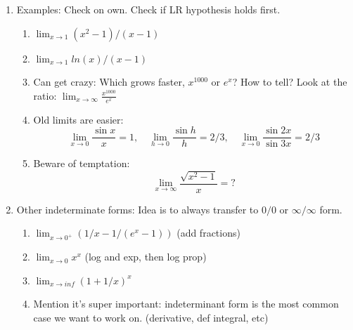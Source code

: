 \documentclass{article}
\newcommand{\ds}{\displaystyle}
\begin{document}
\begin{enumerate}
\item Examples: Check on own. Check if LR hypothesis holds first.
\begin{enumerate}
\item $\ds \lim_{x \rightarrow 1} (x^2-1)/(x-1)$
\item $\ds \lim_{x \rightarrow 1} ln(x)/(x-1)$
\item Can get crazy: Which grows faster, $x^{1000}$ or $e^x$? How to tell? Look at the ratio: $\ds \lim_{x\rightarrow \infty} \frac{x^{1000}}{e^x}$
\item Old limits are easier:
$$
\lim_{x\rightarrow 0 } \frac{\sin x}{x} = 1,\quad 
\lim_{h\rightarrow 0} \frac{\sin h}{h} = 2/3,\quad 
\lim_{x\rightarrow 0} \frac{\sin 2x}{\sin 3x} = 2/3
$$
\item Beware of temptation: 
$$\lim_{x\rightarrow \infty} \frac{\sqrt{x^2-1}}{x} = ?$$
\end{enumerate}

\item Other indeterminate forms: Idea is to always transfer to $0/0$ or $\infty/\infty$ form.
\begin{enumerate}
\item $\ds \lim_{x \rightarrow 0^+} (1/x - 1/(e^x-1))$ (add fractions)
\item $\ds \lim_{x \rightarrow 0} x^x$ (log and exp, then log prop)
\item $\ds \lim_{x \rightarrow inf} (1+1/x)^x$
\item Mention it's super important: indeterminant form is the most common case we want to work on. (derivative, def integral, etc)
\end{enumerate}
\end{enumerate}



\end{document}
